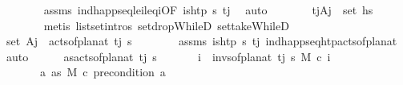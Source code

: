 \begin{isabellebody}
\ \ \ \ \ \ \isamarkupfalse%
\ assms\ ind{\isacharunderscore}{\kern0pt}happ{\isacharunderscore}{\kern0pt}seq{\isacharunderscore}{\kern0pt}le\isactrlsub i{\isacharunderscore}{\kern0pt}leq\isactrlsub i{\isacharbrackleft}{\kern0pt}OF\ {\isacartoucheopen}is{\isacharunderscore}{\kern0pt}htp\ {\isasympi}s\ t\isactrlsub j{\isacartoucheclose}{\isacharbrackright}{\kern0pt}\ \isamarkupfalse%
\ auto\isanewline
\ \ \ \ \isamarkupfalse%
\ \isamarkupfalse%
\ {\isachardoublequoteopen}{\isacharparenleft}{\kern0pt}t\isactrlsub j{\isacharcomma}{\kern0pt}A\isactrlsub j{\isacharparenright}{\kern0pt}\ {\isasymin}\ set\ hs{\isachardoublequoteclose}\isanewline
\ \ \ \ \ \ \isamarkupfalse%
\ {\isacharparenleft}{\kern0pt}metis\ list{\isachardot}{\kern0pt}set{\isacharunderscore}{\kern0pt}intros{\isacharparenleft}{\kern0pt}{}{\isacharparenright}{\kern0pt}\ set{\isacharunderscore}{\kern0pt}dropWhileD\ set{\isacharunderscore}{\kern0pt}takeWhileD{\isacharparenright}{\kern0pt}\isanewline
\ \ \ \ \isamarkupfalse%
\ \isamarkupfalse%
\ {\isachardoublequoteopen}set\ A\isactrlsub j\ {\isacharequal}{\kern0pt}\ acts{\isacharunderscore}{\kern0pt}of{\isacharunderscore}{\kern0pt}plan{\isacharunderscore}{\kern0pt}at\ t\isactrlsub j\ {\isasympi}s{\isachardoublequoteclose}\isanewline
\ \ \ \ \ \ \isamarkupfalse%
\ assms\ {\isacartoucheopen}is{\isacharunderscore}{\kern0pt}htp\ {\isasympi}s\ t\isactrlsub j{\isacartoucheclose}\ ind{\isacharunderscore}{\kern0pt}happ{\isacharunderscore}{\kern0pt}seq{\isacharunderscore}{\kern0pt}htp{\isacharunderscore}{\kern0pt}acts{\isacharunderscore}{\kern0pt}of{\isacharunderscore}{\kern0pt}plan{\isacharunderscore}{\kern0pt}at\ \isamarkupfalse%
\ auto\isanewline
\ \ \ \ \isamarkupfalse%
\ {\isacharquery}{\kern0pt}as{\isacharequal}{\kern0pt}{\isachardoublequoteopen}acts{\isacharunderscore}{\kern0pt}of{\isacharunderscore}{\kern0pt}plan{\isacharunderscore}{\kern0pt}at\ t\isactrlsub j\ {\isasympi}s{\isachardoublequoteclose}\isanewline
\ \ \ \ \isamarkupfalse%
\ {}{\isacharcolon}{\kern0pt}\ {\isachardoublequoteopen}{\isasymforall}i\ {\isasymin}\ invs{\isacharunderscore}{\kern0pt}of{\isacharunderscore}{\kern0pt}plan{\isacharunderscore}{\kern0pt}at\ t\isactrlsub j\ {\isasympi}s{\isachardot}{\kern0pt}\ M\ \isactrlsup c{\isasymTTurnstile}\isactrlsub {\isacharequal}{\kern0pt}\ i{\isachardoublequoteclose}\isanewline
\ \ \ \ \ \ {}{\isacharcolon}{\kern0pt}\ {\isachardoublequoteopen}{\isasymforall}a{\isasymin}\ {\isacharquery}{\kern0pt}as{\isachardot}{\kern0pt}\ M\ \isactrlsup c{\isasymTTurnstile}\isactrlsub {\isacharequal}{\kern0pt}\ precondition\ a{\isachardoublequoteclose}\ \isanewline

\end{isabellebody}
